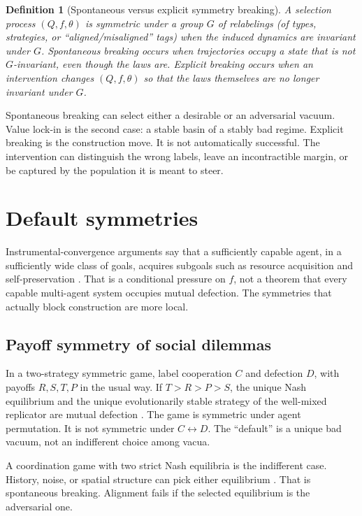 \documentclass[11pt]{article}
\newtheorem{definition}{Definition}
\begin{document}
\begin{definition}[Spontaneous versus explicit symmetry breaking]
A selection process \((Q,f,\theta)\) is \emph{symmetric} under a group \(G\) of relabelings (of types, strategies, or ``aligned/misaligned'' tags) when the induced dynamics are invariant under \(G\). \emph{Spontaneous} breaking occurs when trajectories occupy a state that is not \(G\)-invariant, even though the laws are. \emph{Explicit} breaking occurs when an intervention changes \((Q,f,\theta)\) so that the laws themselves are no longer invariant under \(G\).
\end{definition}

Spontaneous breaking can select either a desirable or an adversarial vacuum. Value lock-in is the second case: a stable basin of a stably bad regime. Explicit breaking is the construction move. It is not automatically successful. The intervention can distinguish the wrong labels, leave an incontractible margin, or be captured by the population it is meant to steer.

\section{Default symmetries}

Instrumental-convergence arguments say that a sufficiently capable agent, in a sufficiently wide class of goals, acquires subgoals such as resource acquisition and self-preservation \parencite{omohundro2008,bostrom2014}. That is a conditional pressure on \(f\), not a theorem that every capable multi-agent system occupies mutual defection. The symmetries that actually block construction are more local.

\subsection{Payoff symmetry of social dilemmas}

In a two-strategy symmetric game, label cooperation \(C\) and defection \(D\), with payoffs \(R,S,T,P\) in the usual way. If \(T>R>P>S\), the unique Nash equilibrium and the unique evolutionarily stable strategy of the well-mixed replicator are mutual defection \parencite{nowak2006}. The game is symmetric under agent permutation. It is not symmetric under \(C\leftrightarrow D\). The ``default'' is a unique bad vacuum, not an indifferent choice among vacua.

A coordination game with two strict Nash equilibria is the indifferent case. History, noise, or spatial structure can pick either equilibrium \parencite{skyrms2004,nowak1992}. That is spontaneous breaking. Alignment fails if the selected equilibrium is the adversarial one.
\end{document}
